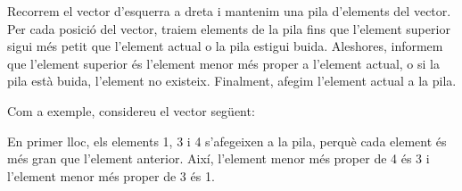 Recorrem el vector d'esquerra a dreta i mantenim una pila d'elements
del vector. Per cada posició del vector, traiem elements de la pila
fins que l'element superior sigui més petit que l'element actual o la
pila estigui buida. Aleshores, informem que l'element superior és
l'element menor més proper a l'element actual, o si la pila està
buida, l'element no existeix. Finalment, afegim l'element actual a la
pila.

Com a exemple, considereu el vector següent:
\begin{center}
\end{center}


En primer lloc, els elements 1, 3 i 4 s'afegeixen a la pila, perquè
cada element és més gran que l'element anterior. Així, l'element menor
més proper de 4 és 3 i l'element menor més proper de 3 és 1.
\begin{center}
\end{center}


